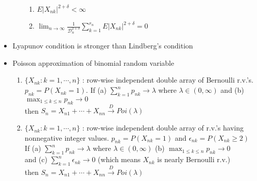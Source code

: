 \documentclass[12pt, A4]{article}
\begin{document}
\begin{itemize}
\begin{itemize}
		\begin{enumerate}
			\item $E|X_{nk}|^{2+\delta}<\infty$
			\item $\lim_{n \to \infty}\frac{1}{\mathcal{D}_n^{2+\delta}}\sum_{k=1}^{r_n}E|X_{nk}|^{2+\delta}=0$
		\end{enumerate}
	\end{itemize}
	\item Lyapunov condition is stronger than Lindberg's condition
	\item Poisson approximation of binomial random variable
	\begin{enumerate}
		\item $\{X_{nk}:k=1,\cdots, n\}$ : row-wise independent double array of Bernoulli r.v.'s. \\ $p_{nk}=P(X_{nk}=1)$. 
		If (a) $\sum_{k=1}^{n}p_{nk}\rightarrow \lambda$ where $\lambda\in(0,\infty)$ and (b) $\max_{1\leq k \leq n} p_{nk}\rightarrow 0$
		\\ then $S_n=X_{n1}+\cdots+X_{nn}\xrightarrow{D}Poi(\lambda)$
		\item  $\{X_{nk}:k=1,\cdots, n\}$ : row-wise independent double array of r.v.'s having nonnegative integer values. \quad $p_{nk}=P(X_{nk}=1)$ and  $\epsilon_{nk}=P(X_{nk}\geq2)$ \\
		If (a) $\sum_{k=1}^{n}p_{nk}\rightarrow \lambda$ where $\lambda\in(0,\infty)$ \quad (b) $\max_{1\leq k \leq n} p_{nk}\rightarrow 0$ \\and (c) $\sum_{k=1}^{n}\epsilon_{nk}\rightarrow 0$ (which means $X_{nk}$ is nearly Bernoulli r.v.)
		\\then $S_n=X_{n1}+\cdots+X_{nn}\xrightarrow{D}Poi(\lambda)$
	\end{enumerate}
\end{itemize}
\end{document}

